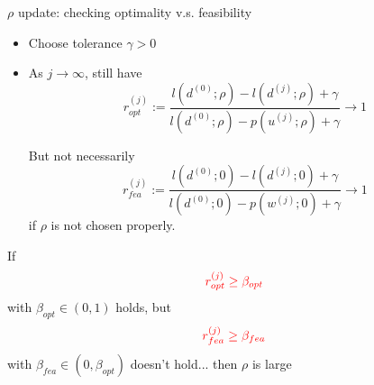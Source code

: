 \documentclass[8pt]{beamer}
\begin{document}
	\begin{frame}{$\rho$ update: checking optimality v.s. feasibility}
		\begin{itemize}
			\item   Choose tolerance $\gamma>0$
			\item  As $j\to \infty$, still have 
				$$r^{(j)}_{opt} := \frac{l(d^{(0)};\rho) - l (d^{(j)};\rho) + \gamma  }{l(d^{(0)}; \rho) - p (u^{(j)};\rho) + \gamma } \to 1 $$

				But not necessarily 
				\[
					r^{(j)}_{fea} := \frac{l(d^{(0)};0) - l (d^{(j)};0) + \gamma}{l(d^{(0)}; 0)- p(w^{(j)};0) + \gamma}  \to 1
				\]
				if $\rho$ is not chosen properly. 
		\end{itemize}
		\vfill 
		If
		\[ {\color{red} r^{(j)}_{opt}  \ge \beta_{opt}} \]
		with $\beta_{opt} \in (0,1)$ holds, but  
		\[ {\color{red} r^{(j)}_{fea} \ge \beta_{fea} } \]
		with $\beta_{fea}    \in (0,\beta_{opt} )$ doesn't hold... then $\rho$ is large
		\vfill
	\end{frame}

\end{document}

